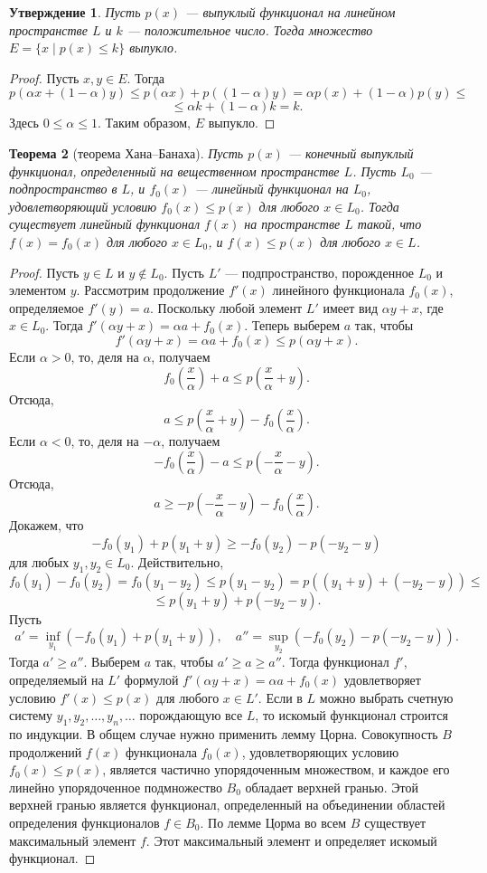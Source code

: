 \documentclass[12pt, titlepage, oneside]{amsbook}
\newtheorem{theorem}{Теорема}[chapter]
\newtheorem{claim}[theorem]{Утверждение}
\theoremstyle{definition}
\theoremstyle{remark}
\begin{document}
 \begin{claim}
\label{Vyp2}
Пусть $p(x)$ --- выпуклый функционал на линейном пространстве $L$ и $k$ --- положительное число. Тогда множество $E=\{x\mid p(x)\leq k\}$ выпукло.
\end{claim}

\begin{proof}
Пусть $x,y\in E$. Тогда $$p(\alpha x+(1-\alpha)y)\leq p(\alpha x)+p((1-\alpha)y)=\alpha p(x)+(1-\alpha)p(y)\leq$$ $$\leq\alpha k+(1-\alpha)k=k.$$ Здесь $0\leq\alpha\leq 1$. Таким образом, $E$ выпукло.
\end{proof}

\begin{theorem}[теорема Хана--Банаха]
\label{HanBan1}
Пусть $p(x)$ --- конечный выпуклый функционал, определенный на вещественном пространстве $L$. Пусть $L_0$ --- подпространство в $L$, и $f_0(x)$ --- линейный функционал на $L_0$, удовлетворяющий условию $f_0(x)\leq p(x)$ для любого $x\in L_0$. Тогда существует линейный функционал $f(x)$ на пространстве $L$ такой, что $f(x)=f_0(x)$ для любого $x\in L_0$, и $f(x)\leq p(x)$ для любого $x\in L$.
\end{theorem}

\begin{proof}
Пусть $y\in L$ и $y\not\in L_0$. Пусть $L'$ --- подпространство, порожденное $L_0$ и элементом $y$. Рассмотрим продолжение $f'(x)$ линейного функционала $f_0(x)$, определяемое $f'(y)=a$. Поскольку любой элемент $L'$ имеет вид $\alpha y+x$, где $x\in L_0$. Тогда $f'(\alpha y+x)=\alpha a+f_0(x)$. Теперь выберем $a$ так, чтобы $$f'(\alpha y+x)=\alpha a+f_0(x)\leq p(\alpha y+x).$$ Если $\alpha>0$, то, деля на $\alpha$, получаем $$f_0\left(\frac{x}{\alpha}\right)+a\leq p\left(\frac{x}{\alpha}+y\right).$$ Отсюда, $$a\leq p\left(\frac{x}{\alpha}+y\right)-f_0\left(\frac{x}{\alpha}\right).$$ Если $\alpha<0$, то, деля на $-\alpha$, получаем $$-f_0\left(\frac{x}{\alpha}\right)-a\leq p\left(-\frac{x}{\alpha}-y\right).$$ Отсюда, $$a\geq -p\left(-\frac{x}{\alpha}-y\right)-f_0\left(\frac{x}{\alpha}\right).$$ Докажем, что $$-f_0(y_1)+p(y_1+y)\geq -f_0(y_2)-p(-y_2-y)$$ для любых $y_1,y_2\in L_0$. Действительно, $$f_0(y_1)-f_0(y_2)=f_0(y_1-y_2)\leq p(y_1-y_2)=p((y_1+y)+(-y_2-y))\leq$$ $$\leq p(y_1+y)+p(-y_2-y).$$ Пусть $$a'=\inf\limits_{y_1}(-f_0(y_1)+p(y_1+y)),\quad a''=\sup\limits_{y_2}(-f_0(y_2)-p(-y_2-y)).$$ Тогда $a'\geq a''$. Выберем $a$ так, чтобы $a'\geq a\geq a''$. Тогда функционал $f'$, определяемый на $L'$ формулой $f'(\alpha y+x)=\alpha a+f_0(x)$ удовлетворяет условию $f'(x)\leq p(x)$ для любого $x\in L'$. Если в $L$ можно выбрать счетную систему $y_1,y_2,\ldots,y_n,\ldots$ порождающую все $L$, то искомый функционал строится по индукции. В общем случае нужно применить лемму Цорна. Совокупность $B$ продолжений $f(x)$ функционала $f_0(x)$, удовлетворяющих условию $f_0(x)\leq p(x)$, является частично упорядоченным множеством, и каждое его линейно упорядоченное подмножество $B_0$ обладает верхней гранью. Этой верхней гранью является функционал, определенный на объединении областей определения функционалов $f\in B_0$. По лемме Цорма во всем $B$ существует максимальный элемент $f$. Этот максимальный элемент и определяет искомый функционал.
\end{proof}
\end{document}
